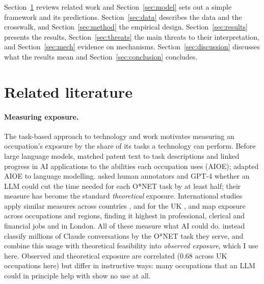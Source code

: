 \documentclass[11pt]{article}
\begin{document}
Section~\ref{sec:lit} reviews related work and Section~\ref{sec:model} sets out a simple framework and its predictions. Section~\ref{sec:data} describes the data and the crosswalk, and Section~\ref{sec:method} the empirical design. Section~\ref{sec:results} presents the results, Section~\ref{sec:threats} the main threats to their interpretation, and Section~\ref{sec:mech} evidence on mechanisms. Section~\ref{sec:discussion} discusses what the results mean and Section~\ref{sec:conclusion} concludes.

\section{Related literature}\label{sec:lit}

\paragraph{Measuring exposure.} The task-based approach to technology and work \citep{autor2003,acemoglu2011,acemoglu2018,acemoglu2019} motivates measuring an occupation's exposure by the share of its tasks a technology can perform. Before large language models, \citet{webb2020} matched patent text to task descriptions and \citet{felten2021} linked progress in AI applications to the abilities each occupation uses (AIOE); \citet{felten2023} adapted AIOE to language modelling. \citet{eloundou2024} asked human annotators and GPT-4 whether an LLM could cut the time needed for each O*NET task by at least half; their measure has become the standard \emph{theoretical} exposure. International studies apply similar measures across countries \citep{gmyrek2023}, and for the UK \citet{dfe2023}, \citet{jung2024} and \citet{henseke2025} map exposure across occupations and regions, finding it highest in professional, clerical and financial jobs and in London. All of these measure what AI could do. \citet{handa2025} instead classify millions of Claude conversations by the O*NET task they serve, and \citet{massenkoff2026} combine this usage with theoretical feasibility into \emph{observed exposure}, which I use here. Observed and theoretical exposure are correlated (0.68 across UK occupations here) but differ in instructive ways: many occupations that an LLM could in principle help with show no use at all.
\end{document}
